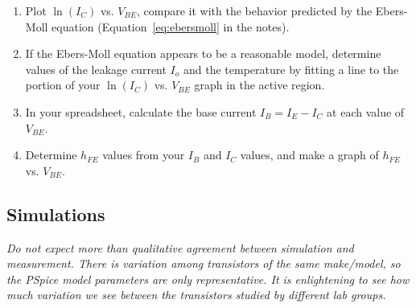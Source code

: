 \documentclass[11pt]{article}
\begin{document}
\begin{enumerate}
\item Plot $\ln(I_C)$ vs. $V_{BE}$, compare it with the behavior
  predicted by the Ebers-Moll equation (Equation~\ref{eq:ebersmoll} in
  the notes).

\item If the Ebers-Moll equation appears to be a reasonable model,
  determine values of the leakage current $I_o$ and the temperature by
  fitting a line to the portion of your $\ln(I_C)$ vs. $V_{BE}$ graph
  in the active region. 

\item In your spreadsheet, calculate the base current $I_B = I_E -
  I_C$ at each value of $V_{BE}$.
  
\item Determine $h_{FE}$ values from your $I_B$ and $I_C$ values, and
  make a graph of $h_{FE}$ vs. $V_{BE}$.
\end{enumerate}

\subsection*{Simulations}

\emph{Do not expect more than qualitative agreement between simulation
and measurement. There is variation among transistors of the same
make/model, so the PSpice model parameters are only representative. It
is enlightening to see how much variation we see between the transistors
studied by different lab groups.}
\end{document}
